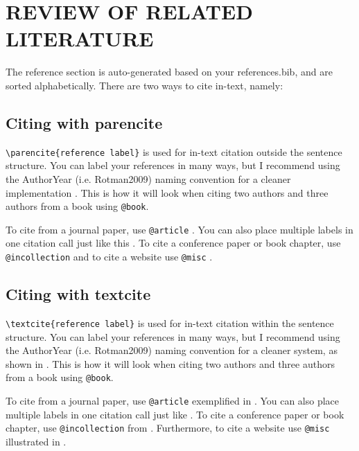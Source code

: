 \section{REVIEW OF RELATED LITERATURE}
\label{sec:REVIEW OF RELATED LITERATURE}

The reference section is auto-generated based on your references.bib, and are sorted alphabetically. There are two ways to cite in-text, namely:

\subsection{Citing with parencite}

\verb|\parencite{reference label}| is used for in-text citation outside the sentence structure. You can label your references in many ways, but I recommend using the AuthorYear (i.e. Rotman2009) naming convention for a cleaner implementation \parencite{Rotman2009}. This is how it will look when citing two authors \parencite{booktwoauthors} and three authors \parencite{bookthreeauthors} from a book using \verb|@book|.

To cite from a journal paper, use \verb|@article| \parencite{journalarticleoneauthor}. You can also place multiple labels in one citation call just like this \parencite{journalarticletwoauthors, journalarticlethreeauthors}. To cite a conference paper or book chapter, use \verb|@incollection| \parencite{bookchapter} and to cite a website use \verb|@misc| \parencite{website}.


\subsection{Citing with textcite}

\verb|\textcite{reference label}| is used for in-text citation within the sentence structure. You can label your references in many ways, but I recommend using the AuthorYear (i.e. Rotman2009) naming convention for a cleaner system, as shown in \textcite{Rotman2009}. This is how it will look when citing two authors \textcite{booktwoauthors} and three authors \textcite{bookthreeauthors} from a book using \verb|@book|.

To cite from a journal paper, use \verb|@article| exemplified in \textcite{journalarticleoneauthor}. You can also place multiple labels in one citation call just like \textcite{journalarticletwoauthors, journalarticlethreeauthors}. To cite a conference paper or book chapter, use \verb|@incollection| from \textcite{bookchapter}. Furthermore, to cite a website use \verb|@misc| illustrated in \textcite{website}.